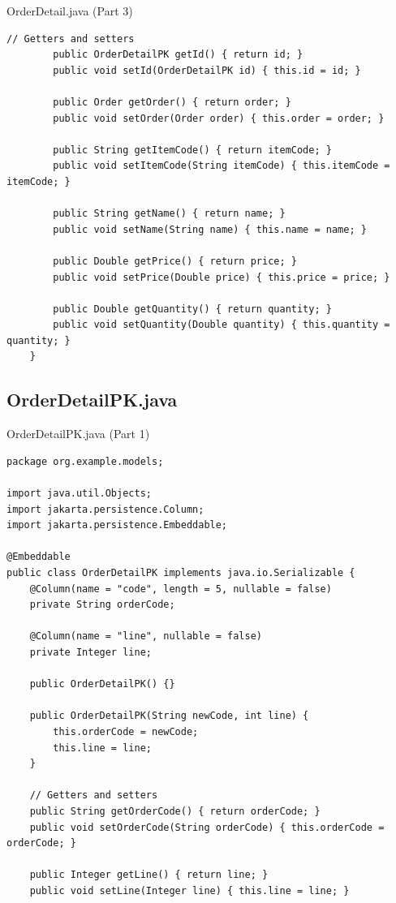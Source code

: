 \documentclass[aspectratio=169, table]{beamer}
\begin{document}
\begin{frame}[fragile]{OrderDetail.java (Part 3)}
	\vspace{20pt}
	\begin{lstlisting}[style=JavaStyle]
		// Getters and setters
		public OrderDetailPK getId() { return id; }
		public void setId(OrderDetailPK id) { this.id = id; }
		
		public Order getOrder() { return order; }
		public void setOrder(Order order) { this.order = order; }
		
		public String getItemCode() { return itemCode; }
		public void setItemCode(String itemCode) { this.itemCode = itemCode; }
		
		public String getName() { return name; }
		public void setName(String name) { this.name = name; }
		
		public Double getPrice() { return price; }
		public void setPrice(Double price) { this.price = price; }
		
		public Double getQuantity() { return quantity; }
		public void setQuantity(Double quantity) { this.quantity = quantity; }
	}
\end{lstlisting}
\end{frame}

\subsection{OrderDetailPK.java}
\begin{frame}[fragile]{OrderDetailPK.java (Part 1)}
\vspace{20pt}
\begin{lstlisting}[style=JavaStyle]
package org.example.models;

import java.util.Objects;
import jakarta.persistence.Column;
import jakarta.persistence.Embeddable;

@Embeddable
public class OrderDetailPK implements java.io.Serializable {
	@Column(name = "code", length = 5, nullable = false)
	private String orderCode;
	
	@Column(name = "line", nullable = false)
	private Integer line;
	
	public OrderDetailPK() {}
	
	public OrderDetailPK(String newCode, int line) {
		this.orderCode = newCode;
		this.line = line;
	}
	
	// Getters and setters
	public String getOrderCode() { return orderCode; }
	public void setOrderCode(String orderCode) { this.orderCode = orderCode; }
	
	public Integer getLine() { return line; }
	public void setLine(Integer line) { this.line = line; }
\end{lstlisting}
\end{frame}
\end{document}
